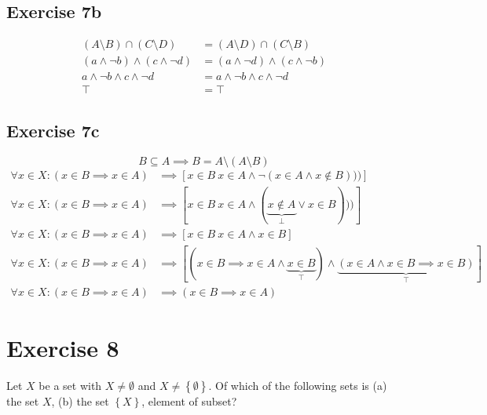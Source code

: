 \documentclass[a4paper]{article}
\theoremstyle{definition}
\newcommand\set[1]{\left\{#1\right\}}
\begin{document}
\subsection{Exercise 7b}
\begin{align*}
  (A \setminus B) \cap (C \setminus D) &= (A \setminus D) \cap (C \setminus B) \\
  (a \land \neg b) \land (c \land \neg d) &= (a \land \neg d) \land (c \land \neg b) \\
  a \land \neg b \land c \land \neg d &= a \land \neg b \land c \land \neg d \\
  \top &= \top
\end{align*}

\subsection{Exercise 7c}
\[ B \subseteq A \implies B = A \setminus (A \setminus B) \]
%
\begin{align*}
  \forall x \in X: (x \in B \implies x \in A) &\implies \left[
          x \in B \ x \in A \land \neg (x \in A \land x \not\in B)))
      \right] \\
  \forall x \in X: (x \in B \implies x \in A) &\implies \left[
          x \in B \ x \in A \land (\underbrace{x \not\in A}_{\bot} \lor x \in B)))
      \right] \\
  \forall x \in X: (x \in B \implies x \in A) &\implies \left[
          x \in B \ x \in A \land x \in B
      \right] \\
  \forall x \in X: (x \in B \implies x \in A) &\implies \left[
          (x \in B \implies x \in A \land \underbrace{x \in B}_{\top}) \land
          \underbrace{(x \in A \land x \in B \implies x \in B)}_{\top}
      \right] \\
  \forall x \in X: (x \in B \implies x \in A) &\implies (x \in B \implies x \in A)
\end{align*}


\section{Exercise 8}

\begin{ex}
  Let $X$ be a set with $X \neq \emptyset$ and $X \neq \set{\emptyset}$. Of which of the following sets is
  (a) the set $X$, (b) the set $\set{X}$, element of subset?
\end{ex}
\end{document}

